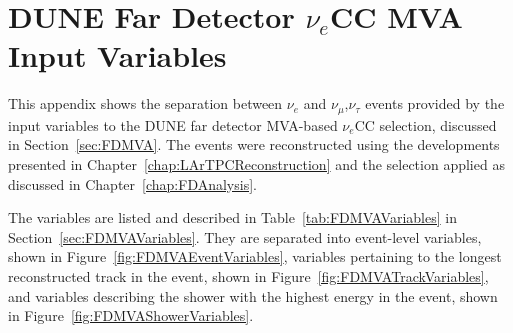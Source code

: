
\graphicspath{{AppendixFDMVAVariables/Figs/}}

\chapter{DUNE Far Detector $\nu_e$CC MVA Input Variables}\label{appen:FDMVAVariables}

This appendix shows the separation between $\nu_e$ and $\nu_{\mu}$,$\nu_{\tau}$ events provided by the input variables to the DUNE far detector MVA-based $\nu_e$CC selection, discussed in Section~\ref{sec:FDMVA}.  The events were reconstructed using the developments presented in Chapter~\ref{chap:LArTPCReconstruction} and the selection applied as discussed in Chapter~\ref{chap:FDAnalysis}.

The variables are listed and described in Table~\ref{tab:FDMVAVariables} in Section~\ref{sec:FDMVAVariables}.  They are separated into event-level variables, shown in Figure~\ref{fig:FDMVAEventVariables}, variables pertaining to the longest reconstructed track in the event, shown in Figure~\ref{fig:FDMVATrackVariables}, and variables describing the shower with the highest energy in the event, shown in Figure~\ref{fig:FDMVAShowerVariables}.

